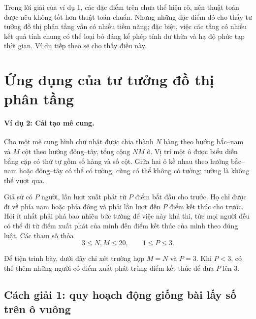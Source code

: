 \documentclass[11pt]{article}
\begin{document}
Trong lời giải của ví dụ 1, các đặc điểm trên chưa thể hiện rõ, nên thuật
toán được nêu không tốt hơn thuật toán chuẩn. Nhưng những đặc điểm đó cho
thấy tư tưởng đồ thị phân tầng vẫn có nhiều tiềm năng; đặc biệt, việc các
tầng có nhiều kết quả tính chung có thể loại bỏ đáng kể phép tính dư thừa và
hạ độ phức tạp thời gian. Ví dụ tiếp theo sẽ cho thấy điều này.

\section{Ứng dụng của tư tưởng đồ thị phân tầng}

\paragraph{Ví dụ 2: Cải tạo mê cung.}
Cho một mê cung hình chữ nhật được chia thành $N$ hàng theo hướng bắc--nam và
$M$ cột theo hướng đông--tây, tổng cộng $N M$ ô. Vị trí một ô được biểu diễn
bằng cặp có thứ tự gồm số hàng và số cột. Giữa hai ô kề nhau theo hướng
bắc--nam hoặc đông--tây có thể có tường, cũng có thể không có tường; tường là
không thể vượt qua.

Giả sử có $P$ người, lần lượt xuất phát từ $P$ điểm bắt đầu cho trước. Họ chỉ
được đi về phía nam hoặc phía đông và phải lần lượt đến $P$ điểm kết thúc cho
trước. Hỏi ít nhất phải phá bao nhiêu bức tường để việc này khả thi, tức mọi
người đều có thể đi từ điểm xuất phát của mình đến điểm kết thúc của mình
theo đúng luật. Các tham số thỏa
\[
  3\le N,M\le 20,\qquad 1\le P\le 3.
\]

Để tiện trình bày, dưới đây chỉ xét trường hợp $M=N$ và $P=3$. Khi $P<3$, có
thể thêm những người có điểm xuất phát trùng điểm kết thúc để đưa $P$ lên
$3$.

\subsection{Cách giải 1: quy hoạch động giống bài lấy số trên ô vuông}
\end{document}
